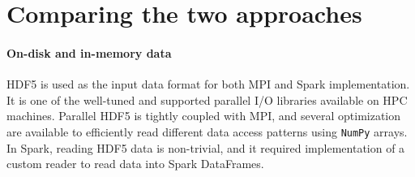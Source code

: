 \documentclass[10pt, twocolumn]{article}
\newcommand{\squeezeup}{\vspace{-5.5mm}}
\begin{document}




\squeezeup
\section{Comparing the two approaches}
\squeezeup
 \paragraph{On-disk and in-memory data} 
HDF5 is used as the input data format for both MPI and Spark implementation. 
It is one of the well-tuned and supported parallel I/O libraries available on HPC machines. 
Parallel HDF5 is tightly coupled with MPI, and several optimization are 
available to efficiently read different data access patterns using  \texttt{NumPy} arrays. 
In Spark, reading HDF5 data is non-trivial, and it required implementation of a custom reader 
to read data into Spark DataFrames. 
\end{document}
